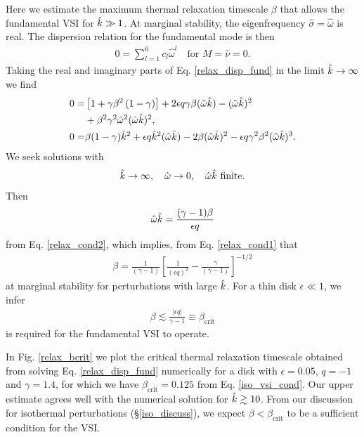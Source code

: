 Here we estimate the maximum thermal relaxation timescale
$\beta$ that allows the fundamental VSI for $\hat{k}\gg1$.   
At marginal stability, the eigenfrequency $\hat{\sigma}=\hat{\omega}$
is real. The dispersion relation for the fundamental mode is then
\begin{align}\label{relax_disp_fund}
  0 = \sum_{l=1}^{6}c_l\hat{\omega}^l \quad \text{for $M=\hat{\nu}=0$}.  
\end{align} 
Taking the real and imaginary parts of Eq. \ref{relax_disp_fund} in
the limit $\hat{k}\to\infty$ we find
\begin{align}
  0 =& \left[1 + \gamma\beta^2\left(1-\gamma\right)\right] + 2\epsilon q
  \gamma\beta (\hat{\omega}\hat{k}) -  (\hat{\omega}\hat{k})^2 \notag\\
  &+ \beta^2\gamma^2\hat{\omega}^2 (\hat{\omega}\hat{k})^2,\label{relax_cond1}\\
  0=& \beta(1-\gamma)\hat{k}^2 + \epsilon q \hat{k}^2 (\hat{\omega}\hat{k})
  - 2\beta (\hat{\omega}\hat{k})^2 - \epsilon q \gamma^2\beta^2 (\hat{\omega}\hat{k})^3.\label{relax_cond2}
\end{align}
We seek solutions with
\begin{align}
  \hat{k} \to \infty, \quad \hat{\omega}\to 0 ,\quad \hat{\omega} \hat{k}\text{ finite}.
\end{align}
Then
\begin{align}
  \hat{\omega}\hat{k} = \frac{(\gamma-1)\beta}{\epsilon q}
\end{align}
from Eq. \ref{relax_cond2}, which implies, from Eq. \ref{relax_cond1}
that
\begin{align}
  \beta = \frac{1}{(\gamma-1)}\left[\frac{1}{\left(\epsilon
        q\right)^2} - \frac{\gamma}{(\gamma-1)}\right]^{-1/2} 
\end{align}
at marginal stability for perturbations with large $\hat{k}$. 
For a thin disk $\epsilon\ll 1$, we infer 
\begin{align}\label{iso_vsi_cond}
  \beta \lesssim \frac{|\epsilon q|}{\gamma-1} \equiv
  \beta_\mathrm{crit} 
\end{align}
is required for the fundamental VSI to operate.  

In Fig. \ref{relax_bcrit} we plot the critical thermal relaxation
timescale obtained from solving Eq. \ref{relax_disp_fund} numerically 
for a disk with $\epsilon = 0.05$, $q=-1$ and $\gamma=1.4$, for which
we have $\beta_\mathrm{crit}=0.125$ from Eq. \ref{iso_vsi_cond}. Our
upper estimate agrees well with the numerical solution for $\hat{k}\gtrsim
10$. From our discussion for isothermal perturbations
(\S\ref{iso_discuss}), we expect $\beta<\beta_\mathrm{crit}$ to be a
sufficient condition for the VSI. 

